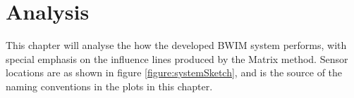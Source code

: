 \chapter{Analysis}

This chapter will analyse the how the developed BWIM system performs, with special emphasis on the influence lines produced by the Matrix method.
Sensor locations are as shown in figure \ref{figure:systemSketch}, and is the source of the naming conventions in the plots in this chapter.
% 		

